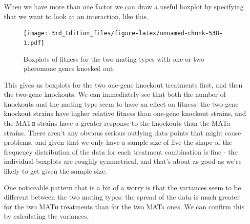 \documentclass[
]{book}
\newenvironment{Shaded}{\begin{snugshade}}{\end{snugshade}}
\newcommand{\DataTypeTok}[1]{\textcolor[rgb]{0.13,0.29,0.53}{#1}}
\newcommand{\FloatTok}[1]{\textcolor[rgb]{0.00,0.00,0.81}{#1}}
\newcommand{\KeywordTok}[1]{\textcolor[rgb]{0.13,0.29,0.53}{\textbf{#1}}}
\newcommand{\NormalTok}[1]{#1}
\newcommand{\OperatorTok}[1]{\textcolor[rgb]{0.81,0.36,0.00}{\textbf{#1}}}
\newcommand{\StringTok}[1]{\textcolor[rgb]{0.31,0.60,0.02}{#1}}
\begin{document}
When we have more than one factor we can draw a useful boxplot by specifying that we want to look at an interaction, like this.

\begin{Shaded}
\end{Shaded}

\begin{figure}
\centering
\texttt{[image: 3rd\_Edition\_files/figure-latex/unnamed-chunk-538-1.pdf]}
\caption{\label{fig:unnamed-chunk-538}Boxplots of fitness for the two mating types with one or two pheromone genes knocked out.}
\end{figure}

This gives us boxplots for the two one-gene knockout treatments first, and then the two-gene knockouts. We can immediately see that both the number of knockouts and the mating type seem to have an effect on fitness: the two-gene knockout strains have higher relative fitness than one-gene knockout strains, and the MATα strains have a greater response to the knockouts than the MATa strains. There aren't any obvious serious outlying data points that might cause problems, and given that we only have a sample size of five the shape of the frequency distribution of the data for each treatment combination is fine - the individual boxplots are roughly symmetrical, and that's about as good as we're likely to get given the sample size.

One noticeable pattern that is a bit of a worry is that the variances seem to be different between the two mating types: the spread of the data is much greater for the two MATα treatments than for the two MATa ones. We can confirm this by calculating the variances.

\begin{Shaded}
\end{Shaded}
\end{document}
